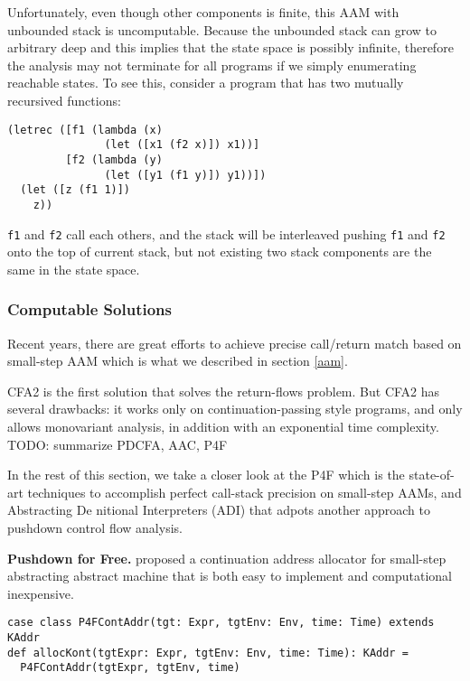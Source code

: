 \documentclass[acmsmall,review,anonymous]{acmart}\settopmatter{printfolios=true,printccs=false,printacmref=false}
\begin{document}
Unfortunately, even though other components is finite, this AAM with unbounded stack is uncomputable. 
Because the unbounded stack can grow to arbitrary deep and this implies that the state space is possibly 
infinite, therefore the analysis may not terminate for all programs if we simply enumerating 
reachable states.
To see this, consider a program that has two mutually recursived functions:

\begin{verbatim}
(letrec ([f1 (lambda (x) 
               (let ([x1 (f2 x)]) x1))]
         [f2 (lambda (y)
               (let ([y1 (f1 y)]) y1))])
  (let ([z (f1 1)])
    z))
\end{verbatim}

\texttt{f1} and \texttt{f2} call each others, and the stack will be interleaved
pushing \texttt{f1} and \texttt{f2} onto the top of current stack, but not existing 
two stack components are the same in the state space.

\subsubsection{Computable Solutions}

Recent years, there are great efforts \cite{vardoulakis2010cfa2, earl2012introspective, 
gilray2016pushdown, johnson2015abstracting} to achieve precise call/return 
match based on small-step AAM which is what we described in section \ref{aam}.

CFA2 is the first solution that solves the return-flows problem\cite{vardoulakis2010cfa2}.
But CFA2 has several drawbacks: it works only on continuation-passing style programs, 
and only allows monovariant analysis, in addition with an exponential time complexity.
TODO: summarize PDCFA, AAC, P4F

In the rest of this section, we take a closer look at the P4F which is the
state-of-art techniques to accomplish perfect call-stack precision on small-step
AAMs, and Abstracting De nitional Interpreters (ADI) that adpots another 
approach to pushdown control flow analysis.

\textbf{Pushdown for Free.}
\citeauthor{gilray2016pushdown} proposed a continuation address allocator for 
small-step abstracting abstract machine that is both easy to implement and
computational inexpensive.

\begin{verbatim}
case class P4FContAddr(tgt: Expr, tgtEnv: Env, time: Time) extends KAddr
def allocKont(tgtExpr: Expr, tgtEnv: Env, time: Time): KAddr = 
  P4FContAddr(tgtExpr, tgtEnv, time)
\end{verbatim}
\end{document}
